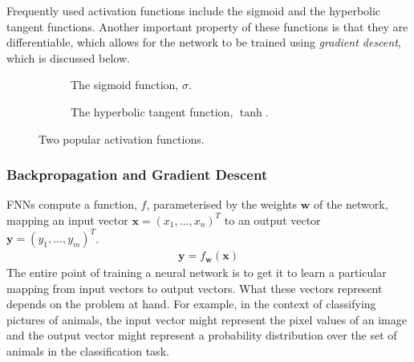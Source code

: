 \documentclass[a4paper, 12pt]{report}
\newcommand{\tit}[1]{\textit{#1}}
\begin{document}
Frequently used activation functions include the sigmoid and the hyperbolic tangent functions. Another important property of these functions is that they are differentiable, which allows for the network to be trained using \tit{gradient descent}, which is discussed below. \\

\begin{figure}[h]
\captionsetup{justification=centering}
\centering
\begin{subfigure}{0.5\linewidth}
	\centering
	\caption{The sigmoid function, $\sigma$.}
\end{subfigure}%
\begin{subfigure}{0.5\linewidth}
	\centering
	\caption{The hyperbolic tangent function, $\tanh$.}
\end{subfigure}
\caption{Two popular activation functions.}
\end{figure}

\subsubsection{Backpropagation and Gradient Descent}

FNNs compute a function, $f$, parameterised by the weights $\mathbf{w}$ of the network, mapping an input vector $\mathbf{x} = (x_1, ..., x_n)^T$ to an output vector $\mathbf{y} = (y_1, ..., y_m)^T$. 
\begin{gather*}
	\mathbf{y} = f_\mathbf{w}(\mathbf{x})
\end{gather*}
The entire point of training a neural network is to get it to learn a particular mapping from input vectors to output vectors. What these vectors represent depends on the problem at hand. For example, in the context of classifying pictures of animals, the input vector might represent the pixel values of an image and the output vector might represent a probability distribution over the set of animals in the classification task. \\
\end{document}
